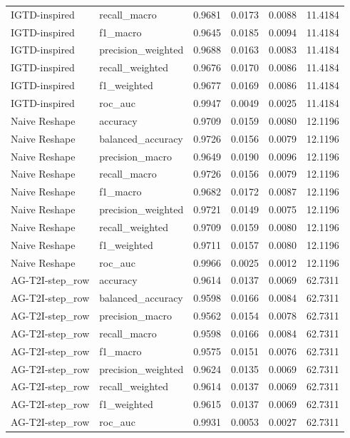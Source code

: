 \begin{tabular}{llrrrr}
IGTD-inspired & recall_macro & 0.9681 & 0.0173 & 0.0088 & 11.4184 \\
IGTD-inspired & f1_macro & 0.9645 & 0.0185 & 0.0094 & 11.4184 \\
IGTD-inspired & precision_weighted & 0.9688 & 0.0163 & 0.0083 & 11.4184 \\
IGTD-inspired & recall_weighted & 0.9676 & 0.0170 & 0.0086 & 11.4184 \\
IGTD-inspired & f1_weighted & 0.9677 & 0.0169 & 0.0086 & 11.4184 \\
IGTD-inspired & roc_auc & 0.9947 & 0.0049 & 0.0025 & 11.4184 \\
Naive Reshape & accuracy & 0.9709 & 0.0159 & 0.0080 & 12.1196 \\
Naive Reshape & balanced_accuracy & 0.9726 & 0.0156 & 0.0079 & 12.1196 \\
Naive Reshape & precision_macro & 0.9649 & 0.0190 & 0.0096 & 12.1196 \\
Naive Reshape & recall_macro & 0.9726 & 0.0156 & 0.0079 & 12.1196 \\
Naive Reshape & f1_macro & 0.9682 & 0.0172 & 0.0087 & 12.1196 \\
Naive Reshape & precision_weighted & 0.9721 & 0.0149 & 0.0075 & 12.1196 \\
Naive Reshape & recall_weighted & 0.9709 & 0.0159 & 0.0080 & 12.1196 \\
Naive Reshape & f1_weighted & 0.9711 & 0.0157 & 0.0080 & 12.1196 \\
Naive Reshape & roc_auc & 0.9966 & 0.0025 & 0.0012 & 12.1196 \\
AG-T2I-step_row & accuracy & 0.9614 & 0.0137 & 0.0069 & 62.7311 \\
AG-T2I-step_row & balanced_accuracy & 0.9598 & 0.0166 & 0.0084 & 62.7311 \\
AG-T2I-step_row & precision_macro & 0.9562 & 0.0154 & 0.0078 & 62.7311 \\
AG-T2I-step_row & recall_macro & 0.9598 & 0.0166 & 0.0084 & 62.7311 \\
AG-T2I-step_row & f1_macro & 0.9575 & 0.0151 & 0.0076 & 62.7311 \\
AG-T2I-step_row & precision_weighted & 0.9624 & 0.0135 & 0.0069 & 62.7311 \\
AG-T2I-step_row & recall_weighted & 0.9614 & 0.0137 & 0.0069 & 62.7311 \\
AG-T2I-step_row & f1_weighted & 0.9615 & 0.0137 & 0.0069 & 62.7311 \\
AG-T2I-step_row & roc_auc & 0.9931 & 0.0053 & 0.0027 & 62.7311 \\

\end{tabular}
